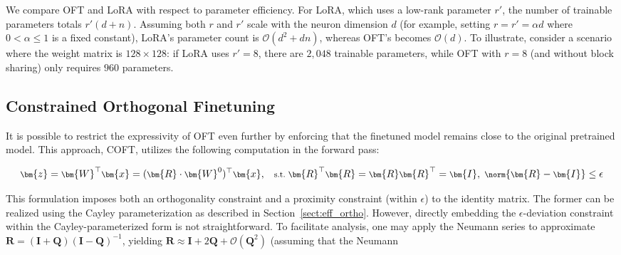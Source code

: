 We compare OFT and LoRA with respect to parameter efficiency. For LoRA, which uses a low-rank parameter $r'$, the number of trainable parameters totals $r'(d+n)$. Assuming both $r$ and $r'$ scale with the neuron dimension $d$ (for example, setting $r = r' = \alpha d$ where $0 < \alpha \leq 1$ is a fixed constant), LoRA’s parameter count is $\mathcal{O}(d^2 + dn)$, whereas OFT’s becomes $\mathcal{O}(d)$. To illustrate, consider a scenario where the weight matrix is $128\times128$: if LoRA uses $r' = 8$, there are $2,048$ trainable parameters, while OFT with $r = 8$ (and without block sharing) only requires $960$ parameters.

\subsection{Constrained Orthogonal Finetuning}

It is possible to restrict the expressivity of OFT even further by enforcing that the finetuned model remains close to the original pretrained model. This approach, COFT, utilizes the following computation in the forward pass:

\begin{equation}\label{eq:coft_general}
    \footnotesize
    \bm{z}=\bm{W}^\top\bm{x}=(\bm{R}\cdot\bm{W}^0)^\top\bm{x},~~~\text{s.t.}~\bm{R}^\top\bm{R}=\bm{R}\bm{R}^\top=\bm{I},~\norm{\bm{R}-\bm{I}}\leq \epsilon
\end{equation}

This formulation imposes both an orthogonality constraint and a proximity constraint (within $\epsilon$) to the identity matrix. The former can be realized using the Cayley parameterization as described in Section~\ref{sect:eff_ortho}. However, directly embedding the $\epsilon$-deviation constraint within the Cayley-parameterized form is not straightforward. To facilitate analysis, one may apply the Neumann series to approximate $\bm{R}=(\bm{I}+\bm{Q})(\bm{I}-\bm{Q})^{-1}$, yielding $\bm{R}\approx\bm{I}+2\bm{Q}+\mathcal{O}(\bm{Q}^2)$ (assuming that the Neumann { \parfillskip=0pt\par}

